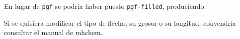 
\vspace{2ex}
En lugar de \texttt{pgf} se podría haber puesto \texttt{pgf-filled},
produciendo:

\vspace{1ex}

Si se quisiera modificar el tipo de flecha, su grosor o su longitud, convendría
consultar el manual de {\sffamily mhchem}.






